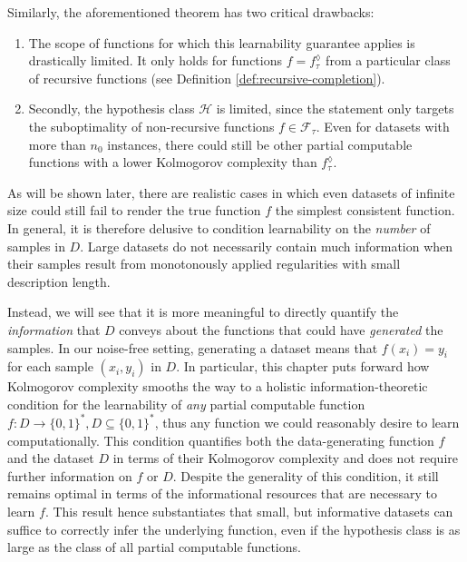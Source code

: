 Similarly, the aforementioned theorem has two critical drawbacks:
\begin{enumerate}
	\item The scope of functions for which this learnability guarantee applies is drastically limited. It only holds for functions $f=f_{\tau}^{\lozenge}$ from a particular class of recursive functions (see Definition \ref{def:recursive-completion}).
	\item Secondly, the hypothesis class $\mathcal{H}$ is limited, since the statement only targets the suboptimality of non-recursive functions $f\in\mathcal{F}_{\tau}$. Even for datasets with more than $n_0$ instances, there could still be other partial computable functions with a lower Kolmogorov complexity than $f_{\tau}^{\lozenge}$.
\end{enumerate}
As will be shown later, there are realistic cases in which even datasets of infinite size could still fail to render the true function $f$ the simplest consistent function.
In general, it is therefore delusive to condition learnability on the \textit{number} of samples in $D$. 
Large datasets do not necessarily contain much information when their samples result from monotonously applied regularities with small description length.

Instead, we will see that it is more meaningful to directly quantify the \textit{information} that $D$ conveys about the functions that could have \textit{generated} the samples.
In our noise-free setting, generating a dataset means that $f(x_i)=y_i$ for each sample $(x_i,y_i)$ in $D$.
In particular, this chapter puts forward how Kolmogorov complexity smooths the way to a holistic information-theoretic condition for the learnability of \textit{any} partial computable function $f:D\to\{0,1\}^{*}, D\subseteq\{0,1\}^{*}$, thus any function we could reasonably desire to learn computationally.
This condition quantifies both the data-generating function $f$ and the dataset $D$ in terms of their Kolmogorov complexity and does not require further information on $f$ or $D$.
Despite the generality of this condition, it still remains optimal in terms of the informational resources that are necessary to learn $f$.
This result hence substantiates that small, but informative datasets can suffice to correctly infer the underlying function, even if the hypothesis class is as large as the class of all partial computable functions.

